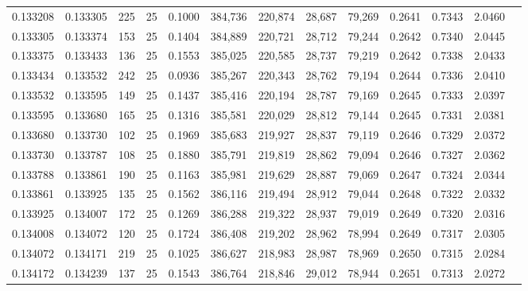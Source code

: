 \begin{tabular}{rrrrrrrrrrrrr}
0.133208 & 0.133305 &   225 &  25 &                                     0.1000 & 384,736 & 220,874 &  28,687 &  79,269 & 0.2641 & 0.7343 & 2.0460 \\
0.133305 & 0.133374 &   153 &  25 &                                     0.1404 & 384,889 & 220,721 &  28,712 &  79,244 & 0.2642 & 0.7340 & 2.0445 \\
0.133375 & 0.133433 &   136 &  25 &                                     0.1553 & 385,025 & 220,585 &  28,737 &  79,219 & 0.2642 & 0.7338 & 2.0433 \\
0.133434 & 0.133532 &   242 &  25 &                                     0.0936 & 385,267 & 220,343 &  28,762 &  79,194 & 0.2644 & 0.7336 & 2.0410 \\
0.133532 & 0.133595 &   149 &  25 &                                     0.1437 & 385,416 & 220,194 &  28,787 &  79,169 & 0.2645 & 0.7333 & 2.0397 \\
0.133595 & 0.133680 &   165 &  25 &                                     0.1316 & 385,581 & 220,029 &  28,812 &  79,144 & 0.2645 & 0.7331 & 2.0381 \\
0.133680 & 0.133730 &   102 &  25 &                                     0.1969 & 385,683 & 219,927 &  28,837 &  79,119 & 0.2646 & 0.7329 & 2.0372 \\
0.133730 & 0.133787 &   108 &  25 &                                     0.1880 & 385,791 & 219,819 &  28,862 &  79,094 & 0.2646 & 0.7327 & 2.0362 \\
0.133788 & 0.133861 &   190 &  25 &                                     0.1163 & 385,981 & 219,629 &  28,887 &  79,069 & 0.2647 & 0.7324 & 2.0344 \\
0.133861 & 0.133925 &   135 &  25 &                                     0.1562 & 386,116 & 219,494 &  28,912 &  79,044 & 0.2648 & 0.7322 & 2.0332 \\
0.133925 & 0.134007 &   172 &  25 &                                     0.1269 & 386,288 & 219,322 &  28,937 &  79,019 & 0.2649 & 0.7320 & 2.0316 \\
0.134008 & 0.134072 &   120 &  25 &                                     0.1724 & 386,408 & 219,202 &  28,962 &  78,994 & 0.2649 & 0.7317 & 2.0305 \\
0.134072 & 0.134171 &   219 &  25 &                                     0.1025 & 386,627 & 218,983 &  28,987 &  78,969 & 0.2650 & 0.7315 & 2.0284 \\
0.134172 & 0.134239 &   137 &  25 &                                     0.1543 & 386,764 & 218,846 &  29,012 &  78,944 & 0.2651 & 0.7313 & 2.0272 \\

\end{tabular}
